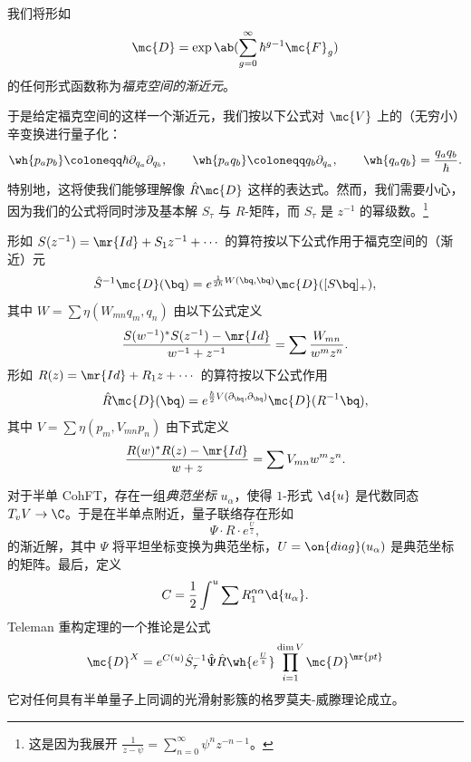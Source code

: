 \begin{defn}
    我们将形如
    \[ \mc{D} = \exp\ab(\sum_{g=0}^{\infty} \hbar^{g-1} \mc{F}_g) \]
    的任何形式函数称为\textit{福克空间的渐近元}。
\end{defn}

于是给定福克空间的这样一个渐近元，我们按以下公式对 $\mc{V}$ 上的（无穷小）辛变换进行量子化：
\[ \wh{p_a p_b} \coloneqq \hbar \partial_{q_a} \partial_{q_b}, \qquad \wh{p_a q_b} \coloneqq q_b \partial_{q_a}, \qquad \wh{q_a q_b} = \frac{q_a q_b}{\hbar}. \]
特别地，这将使我们能够理解像 $\hat{R} \mc{D}$ 这样的表达式。然而，我们需要小心，因为我们的公式将同时涉及基本解 $S_{\tau}$ 与 $R$-矩阵，而 $S_{\tau}$ 是 $z^{-1}$ 的幂级数。\footnote{这是因为我展开 $\frac{1}{z-\psi} = \sum_{n=0}^{\infty} \psi^n z^{-n-1}$。}

\begin{thm}
    形如 $S(z^{-1}) = \mr{Id} + S_1 z^{-1} + \cdots$ 的算符按以下公式作用于福克空间的（渐近）元
    \[ \hat{S}^{-1} \mc{D}(\bq) = e^{\frac{1}{2\hbar}W(\bq,\bq)} \mc{D}([S \bq]_+), \]
    其中 $W = \sum \eta(W_{mn}q_m, q_n)$ 由以下公式定义
    \[ \frac{S(w^{-1})^* S(z^{-1}) - \mr{Id}}{w^{-1}+z^{-1}} = \sum \frac{W_{mn}}{w^m z^n}. \]
    形如 $R(z) = \mr{Id} + R_1 z + \cdots$ 的算符按以下公式作用
    \[ \hat{R}\mc{D}(\bq) = e^{\frac{\hbar}{2} V(\partial_{\bq}, \partial_{\bq})} \mc{D}(R^{-1} \bq), \]
    其中 $V = \sum \eta(p_m, V_{mn} p_n)$ 由下式定义
    \[ \frac{R(w)^* R(z) - \mr{Id}}{w+z} = \sum V_{mn} w^m z^n. \]
\end{thm}

对于半单 CohFT，存在一组\textit{典范坐标} $u_{\alpha}$，使得 $1$-形式 $\d{u}$ 是代数同态 $T_v V \to \C$。于是在半单点附近，量子联络存在形如
\[ \Psi \cdot  R \cdot e^{\frac{U}{z}}, \]
的渐近解，其中 $\Psi$ 将平坦坐标变换为典范坐标，$U = \on{diag}(u_{\alpha})$ 是典范坐标的矩阵。最后，定义
\[ C = \frac{1}{2} \int^u \sum R_1^{\alpha\alpha} \d{u_{\alpha}}. \]
Teleman 重构定理的一个推论是公式
\[ \mc{D}^X = e^{C(u)} \hat{S}^{-1}_{\tau} \hat{\Psi} \hat{R} \wh{e^{\frac{U}{z}}} \prod_{i=1}^{\dim V} \mc{D}^{\mr{pt}} \]
它对任何具有半单量子上同调的光滑射影簇的格罗莫夫-威滕理论成立。


